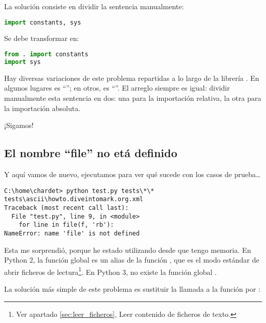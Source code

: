 La solución consiste en dividir la sentencia manualmente:

\begin{lstlisting}[language=Python,breaklines=true]
import constants, sys
\end{lstlisting}

Se debe transformar en:

\begin{lstlisting}[language=Python,breaklines=true]
from . import constants
import sys
\end{lstlisting}

Hay diversas variaciones de este problema repartidas a lo largo de la librería . En algunos lugares es ``''; en otros, es ``''. El arreglo siempre es igual: dividir manualmente esta sentencia en dos: una para la importación relativa, la otra para la importación absoluta.

¡Sigamos!

\subsection{El nombre ``file'' no etá definido}

Y aquí vamos de nuevo, ejecutamos  para ver qué sucede con los casos de prueba\ldots

\noindent\begin{minipage}{\textwidth}
\begin{lstlisting}[breaklines=true]
C:\home\chardet> python test.py tests\*\*
tests\ascii\howto.diveintomark.org.xml
Traceback (most recent call last):
  File "test.py", line 9, in <module>
    for line in file(f, 'rb'):
NameError: name 'file' is not defined
\end{lstlisting}
\end{minipage}


Esta me sorprendió, porque he estado utilizando  desde que tengo memoria. En Python 2, la función global  es un alias de la función , que es el modo estándar de abrir ficheros de lectura\footnote{Ver apartado \ref{sec:leer_ficheros}, Leer contenido de ficheros de texto.}. En Python 3, no existe la función global .

La solución más simple de este problema es sustituir la llamada a la función  por :


